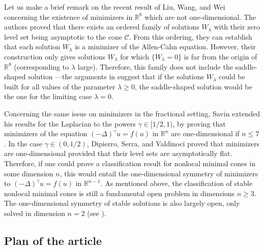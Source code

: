 \documentclass[12pt,reqno]{amsart}
\theoremstyle{definition}
\theoremstyle{remark}
\newcommand{\con}[1]{\mathbb{#1}}
\newcommand{\R}{\con{R}} %
\newcommand{\ccal}{\mathscr{C}}
\newcommand{\s}{\gamma}
\newcommand{\fraclaplacian}{(-\Delta)^\s}
\numberwithin{equation}{section}
\begin{document}
Let us make a brief remark on the recent result of Liu, Wang, and Wei \cite{LiuWangWei} concerning the existence of minimizers in $\R^8$ which are not one-dimensional. The authors proved that there exists an ordered family of solutions $W_\lambda$ with their zero level set being asymptotic to the cone $\ccal$. From this ordering, they can establish that each solution $W_\lambda$ is a minimizer of the Allen-Cahn equation. However, their construction only gives solutions $W_\lambda$ for which $\{W_\lambda = 0\}$ is far from the origin of $\R^8$ (corresponding to $\lambda$ large). Therefore, this family does not include the saddle-shaped solution ---the arguments in \cite{LiuWangWei} suggest that if the solutions $W_\lambda$ could be built for all values of the parameter $\lambda\geq 0$, the saddle-shaped solution would be the one for the limiting case $\lambda = 0$.

Concerning the same issue on minimizers in the fractional setting, Savin \cite{Savin-Fractional, Savin-Fractional2} extended his results for the Laplacian to the powers $\s \in [1/2,1)$, by proving that minimizers of the equation $\fraclaplacian u = f(u)$ in $\R^n$ are one-dimensional if $n\leq 7$. In the case $\s \in (0,1/2)$, Dipierro, Serra, and Valdinoci \cite{DipierroSerraValdinoci} proved that minimizers are one-dimensional provided that their level sets are asymptotically flat. Therefore, if one could prove a classification result for nonlocal minimal cones in some dimension $n$, this would entail the one-dimensional symmetry of minimizers to $\fraclaplacian u = f(u)$ in $\R^{n-1}$. As mentioned above, the classification of stable nonlocal minimal cones is still a fundamental open problem in dimensions $n\geq 3$. The one-dimensional symmetry of stable solutions is also largely open, only solved in dimension $n=2$ (see \cite{CabreSolaMorales, CabreSireII}). %


\subsection{Plan of the article}
\label{Subsec:Plan}
\end{document}
